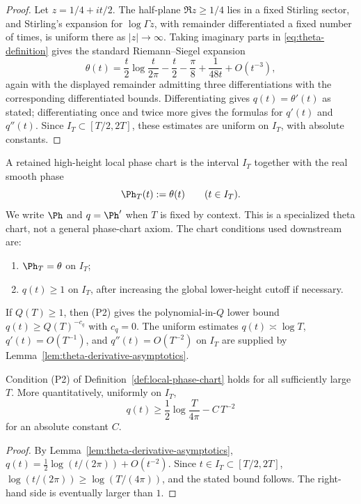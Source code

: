\begin{proof}
Let \(z=1/4+it/2\).  The half-plane \(\Re z\ge 1/4\) lies in a fixed
Stirling sector, and Stirling's expansion for \(\log\Gamma z\), with
remainder differentiated a fixed number of times, is uniform there as
\(|z|\to\infty\).  Taking imaginary parts in \eqref{eq:theta-definition}
gives the standard Riemann--Siegel expansion
\[
\theta(t)=\frac{t}{2}\log\frac{t}{2\pi}-\frac{t}{2}-\frac{\pi}{8}
          +\frac{1}{48 t}+O(t^{-3}),
\]
again with the displayed remainder admitting three differentiations with
the corresponding differentiated bounds.  Differentiating gives
\(q(t)=\theta'(t)\) as stated; differentiating once and twice more gives
the formulas for \(q'(t)\) and \(q''(t)\).  Since
\(I_T\subset[T/2,2T]\), these estimates are uniform on \(I_T\), with
absolute constants.
\end{proof}

\begin{definition}
\label{def:local-phase-chart}
A retained high-height local phase chart is the interval \(I_T\)
together with the real smooth phase
\[
        \Ph_T(t):=\theta(t)\qquad (t\in I_T).
\]
We write \(\Ph\) and \(q=\Ph'\) when \(T\) is fixed by context.  This is a
specialized theta chart, not a general phase-chart axiom.  The chart
conditions used downstream are:
\begin{enumerate}[label=\textup{(P\arabic*)},leftmargin=*]
\item \(\Ph_T = \theta\) on \(I_T\);
\item \(q(t)\ge 1\) on \(I_T\), after increasing the global lower-height
      cutoff if necessary.
\end{enumerate}
If \(Q(T)\ge 1\), then (P2) gives the polynomial-in-\(Q\) lower bound
\(q(t)\ge Q(T)^{-c_q}\) with \(c_q = 0\).  The uniform estimates
\(q(t)\asymp \log T\), \(q'(t)=O(T^{-1})\), and
\(q''(t)=O(T^{-2})\) on \(I_T\) are supplied by
Lemma~\ref{lem:theta-derivative-asymptotics}.
\end{definition}

\begin{lemma}
\label{lem:phase-derivative-lower-bound}
Condition \textup{(P2)} of Definition~\ref{def:local-phase-chart}
holds for all sufficiently large \(T\).  More quantitatively, uniformly
on \(I_T\),
\[
        q(t)\ge \frac12\log\frac{T}{4\pi}-C\,T^{-2}
\]
for an absolute constant \(C\).
\end{lemma}

\begin{proof}
By Lemma~\ref{lem:theta-derivative-asymptotics},
\(q(t)=\tfrac12\log(t/(2\pi))+O(t^{-2})\).  Since
\(t \in I_T \subset [T/2, 2T]\),
\(\log(t/(2\pi)) \ge \log(T/(4\pi))\), and the stated bound follows.
The right-hand side is eventually larger than \(1\).
\end{proof}

